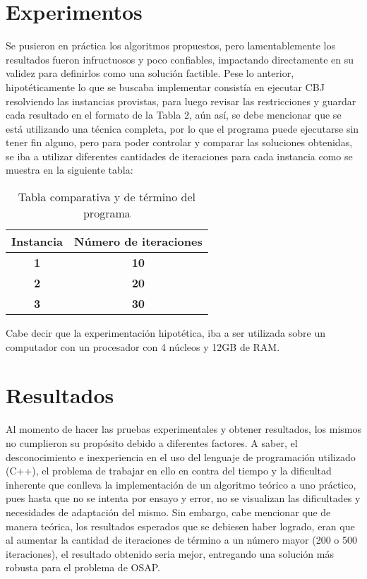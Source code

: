 \documentclass[letter, 10pt]{article}
\begin{document}
\section{Experimentos}

Se pusieron en pr\'actica los algoritmos propuestos, pero lamentablemente los resultados fueron infructuosos y poco confiables, impactando directamente en su validez para definirlos como una soluci\'on factible. 
Pese lo anterior, hipot\'eticamente lo que se buscaba implementar consist\'ia en ejecutar CBJ resolviendo las instancias provistas, para luego revisar las restricciones y guardar cada resultado en el formato de la Tabla 2, a\'un as\'i, se debe mencionar que se est\'a utilizando una t\'ecnica completa, por lo que el programa puede ejecutarse sin tener fin alguno, pero para poder controlar y comparar las soluciones obtenidas, se iba a utilizar diferentes cantidades de iteraciones para cada instancia como se muestra en la siguiente tabla:

\begin{table}[H]
    \begin{center}
    \begin{tabular}{|c|c|}
    \hline
    \textbf{Instancia} & \textbf{N\'umero de iteraciones} \\ \hline
    \textbf{1}         & \textbf{10}           \\ \hline
    \textbf{2}         & \textbf{20}           \\ \hline
    \textbf{3}         & \textbf{30}           \\ \hline
    \end{tabular}
    \end{center}
    \caption{Tabla comparativa y de t\'ermino del programa}
\end{table}
\noindent
Cabe decir que la experimentaci\'on hipot\'etica, iba a ser utilizada sobre un computador con un procesador con 4 n\'ucleos y 12GB de RAM.

\section{Resultados}

Al momento de hacer las pruebas experimentales y obtener resultados, los mismos no cumplieron su prop\'osito debido a diferentes factores. A saber, el desconocimiento e inexperiencia en el uso del lenguaje de programaci\'on utilizado (C++), el problema de trabajar en ello en contra del tiempo y la dificultad inherente que conlleva la implementaci\'on de un algoritmo te\'orico a uno pr\'actico, pues hasta que no se intenta por ensayo y error, no se visualizan las dificultades y necesidades de adaptaci\'on del mismo.
Sin embargo, cabe mencionar que de manera te\'orica, los resultados esperados que se debiesen haber logrado, eran que al aumentar la cantidad de iteraciones de t\'ermino a un n\'umero mayor (200 o 500 iteraciones), el resultado obtenido seria mejor, entregando una soluci\'on m\'as robusta para el problema de OSAP.
\end{document}
